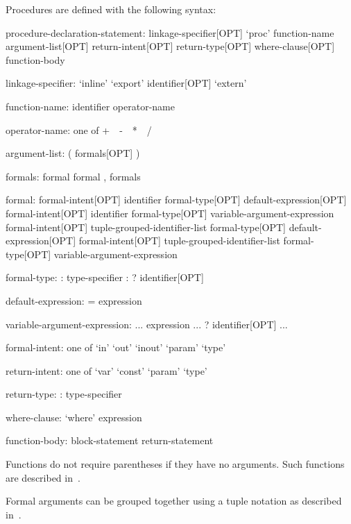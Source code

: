 Procedures are defined with the following syntax:
\begin{syntax}
procedure-declaration-statement:
  linkage-specifier[OPT] `proc' function-name argument-list[OPT] return-intent[OPT] return-type[OPT] where-clause[OPT]
    function-body

linkage-specifier:
  `inline'
  `export' identifier[OPT]
  `extern'

function-name:
  identifier
  operator-name

operator-name: one of
  + $ $ $ $ - $ $ $ $ * $ $ $ $ / $ $ $ $ %

argument-list:
  ( formals[OPT] )

formals:
  formal
  formal , formals

formal:
  formal-intent[OPT] identifier formal-type[OPT] default-expression[OPT]
  formal-intent[OPT] identifier formal-type[OPT] variable-argument-expression
  formal-intent[OPT] tuple-grouped-identifier-list formal-type[OPT] default-expression[OPT]
  formal-intent[OPT] tuple-grouped-identifier-list formal-type[OPT] variable-argument-expression

formal-type:
  : type-specifier
  : ? identifier[OPT]

default-expression:
  = expression

variable-argument-expression:
  ... expression
  ... ? identifier[OPT]
  ...

formal-intent: one of
  `in' `out' `inout' `param' `type'

return-intent: one of
  `var' `const' `param' `type'

return-type:
  : type-specifier

where-clause:
  `where' expression

function-body:
  block-statement
  return-statement
\end{syntax}


Functions do not require parentheses if they have no arguments.  Such
functions are described in~.

Formal arguments can be grouped together using a tuple notation as
described in~.

